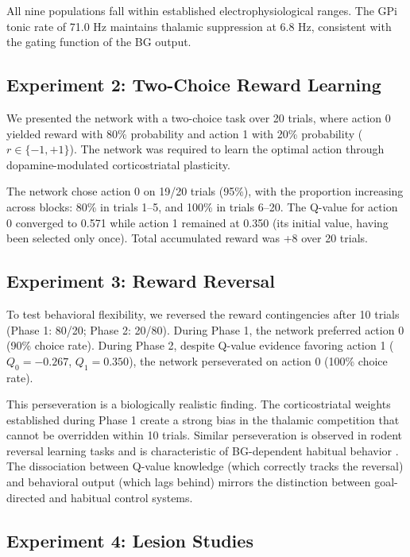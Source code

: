 \documentclass[11pt,a4paper]{article}
\begin{document}
All nine populations fall within established electrophysiological ranges. The GPi tonic rate of 71.0 Hz maintains thalamic suppression at 6.8 Hz, consistent with the gating function of the BG output.

\subsection{Experiment 2: Two-Choice Reward Learning}

We presented the network with a two-choice task over 20 trials, where action 0 yielded reward with 80\% probability and action 1 with 20\% probability ($r \in \{-1, +1\}$). The network was required to learn the optimal action through dopamine-modulated corticostriatal plasticity.

The network chose action 0 on 19/20 trials (95\%), with the proportion increasing across blocks: 80\% in trials 1--5, and 100\% in trials 6--20. The Q-value for action 0 converged to 0.571 while action 1 remained at 0.350 (its initial value, having been selected only once). Total accumulated reward was +8 over 20 trials.

\subsection{Experiment 3: Reward Reversal}

To test behavioral flexibility, we reversed the reward contingencies after 10 trials (Phase 1: 80/20; Phase 2: 20/80). During Phase 1, the network preferred action 0 (90\% choice rate). During Phase 2, despite Q-value evidence favoring action 1 ($Q_0 = -0.267$, $Q_1 = 0.350$), the network perseverated on action 0 (100\% choice rate).

This perseveration is a biologically realistic finding. The corticostriatal weights established during Phase 1 create a strong bias in the thalamic competition that cannot be overridden within 10 trials. Similar perseveration is observed in rodent reversal learning tasks \citep{ragozzino2002} and is characteristic of BG-dependent habitual behavior \citep{yin2004}. The dissociation between Q-value knowledge (which correctly tracks the reversal) and behavioral output (which lags behind) mirrors the distinction between goal-directed and habitual control systems.

\subsection{Experiment 4: Lesion Studies}
\end{document}
